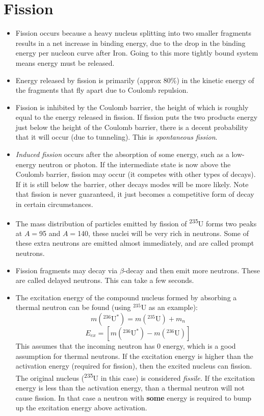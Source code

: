 \documentclass[letter]{article}
\begin{document}
\section{Fission}
\begin{itemize}
\item Fission occurs because a heavy nucleus splitting into two
  smaller fragments results in a net increase in binding energy, due
  to the drop in the binding energy per nucleon curve after
  Iron. Going to this more tightly bound system means energy must be
  released.~\cite[pp. 479]{krane}
\item Energy released by fission is primarily (approx 80\%) in the
  kinetic energy of the fragments that fly apart due to Coulomb
  repulsion.~\cite[pp.479]{krane}
\item Fission is inhibited by the Coulomb barrier, the height of which
  is roughly equal to the energy released in fission. If fission puts
  the two products energy just below the height of the Coulomb
  barrier, there is a decent probability that it will occur (due to
  tunneling). This is \textit{spontaneous
    fission}.~\cite[pp. 481]{krane}
\item \textit{Induced fission} occurs after the absorption of some
  energy, such as a low-energy neutron or photon. If the intermediate
  state is now above the Coulomb barrier, fission may occur (it
  competes with other types of decays). If it is
  still below the barrier, other decays modes will be more
  likely. Note that fission is never guaranteed, it just becomes a
  competitive form of decay in certain
  circumstances.~\cite[pp. 481]{krane}
\item The mass distribution of particles emitted by fission of
  \textsuperscript{235}U forms two
  peaks at $A = $95 and $A = $140, these nuclei will be very rich in
  neutrons. Some of these extra neutrons are emitted almost immediately, and are
  called prompt neutrons.~\cite[pp. 485]{krane}
\item Fission fragments may decay via $\beta$-decay and then emit more
  neutrons. These are called delayed neutrons. This can take a few
  seconds.~\cite[pp. 485]{krane}
\item The excitation energy of the compound nucleus formed by
  absorbing a thermal neutron can be found
  (using $^{235}$U as an example):
  \begin{equation*}
    m(^{236}\text{U}^*)=m(^{235}\text{U})+m_n
  \end{equation*}
  \begin{equation*}
    E_{ex} = [m(^{236}\text{U}^*)-m(^{236}\text{U})]
  \end{equation*}
This assumes that the incoming neutron has 0 energy, which is a good
assumption for thermal neutrons. If the excitation energy is higher than the activation energy
(required for fission), then the excited nucleus can fission. The
original nucleus (\textsuperscript{235}U in this case) is considered
\textit{fissile.} If the excitation energy is less than the activation
energy, than a thermal neutron will not cause fission. In that case a neutron with
\textbf{some} energy is required to bump up the excitation energy
above activation.~\cite[pp. 488-489]{krane}
\end{itemize}
\end{document}
